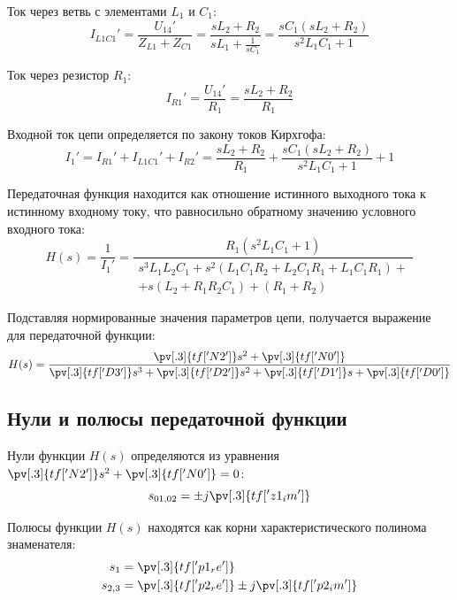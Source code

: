 Ток через ветвь с элементами $L_1$ и $C_1$:
\begin{equation}
    I_{L1C1}' = \frac{U_{14}'}{Z_{L1} + Z_{C1}} = \frac{sL_2 + R_2}{sL_1 + \frac{1}{sC_1}} = \frac{sC_1(sL_2 + R_2)}{s^2 L_1 C_1 + 1}
\end{equation}

Ток через резистор $R_1$:
\begin{equation}
    I_{R1}' = \frac{U_{14}'}{R_1} = \frac{sL_2 + R_2}{R_1}
\end{equation}

Входной ток цепи определяется по закону токов Кирхгофа:
\begin{equation}
    I_1' = I_{R1}' + I_{L1C1}' + I_{R2}' = \frac{sL_2 + R_2}{R_1} + \frac{sC_1(sL_2 + R_2)}{s^2 L_1 C_1 + 1} + 1
\end{equation}

Передаточная функция находится как отношение истинного выходного тока к истинному входному току, что равносильно обратному значению условного входного тока:
\begin{equation}
    H(s) = \frac{1}{I_1'} = \frac{R_1 (s^2 L_1 C_1 + 1)}{
        \begin{multlined}
            s^3 L_1 L_2 C_1 + s^2 (L_1 C_1 R_2 + L_2 C_1 R_1 + L_1 C_1 R_1) + \\
            + s(L_2 + R_1 R_2 C_1) + (R_1 + R_2)
        \end{multlined}
    }
\end{equation}

Подставляя нормированные значения параметров цепи, получается выражение для передаточной функции:
\begin{equation}
    H(s) = \frac{\pv[.3]{tf['N2']}s^2 + \pv[.3]{tf['N0']}}{\pv[.3]{tf['D3']}s^3 + \pv[.3]{tf['D2']}s^2 + \pv[.3]{tf['D1']}s + \pv[.3]{tf['D0']}}
    \label{form:hs}
\end{equation}

\subsection{Нули и полюсы передаточной функции}

Нули функции $H(s)$ определяются из уравнения $\pv[.3]{tf['N2']}s^2 + \pv[.3]{tf['N0']} = 0$:
\begin{equation}
    s_{01,02} = \pm j \pv[.3]{tf['z1_im']}
    \label{form:zeros}
\end{equation}

Полюсы функции $H(s)$ находятся как корни характеристического полинома знаменателя:
\begin{align}
    s_1 &= \pv[.3]{tf['p1_re']} \\
    s_{2,3} &= \pv[.3]{tf['p2_re']} \pm j \pv[.3]{tf['p2_im']}
    \label{form:poles}
\end{align}

